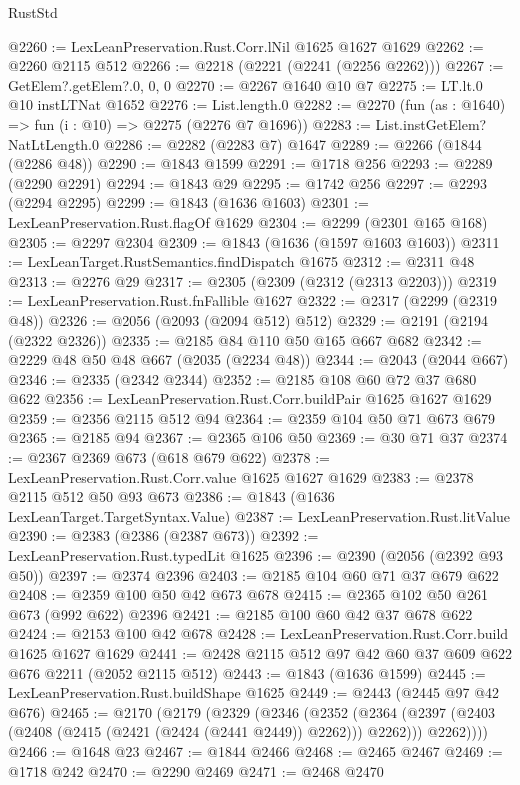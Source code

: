 \begin{lexlean}{RustStd}
\begin{coremodule}
@2260 := LexLeanPreservation.Rust.Corr.lNil @1625 @1627 @1629
@2262 := @2260 @2115 @512
@2266 := @2218 (@2221 (@2241 (@2256 @2262)))
@2267 := GetElem?.getElem?.{0, 0, 0}
@2270 := @2267 @1640 @10 @7
@2275 := LT.lt.{0} @10 instLTNat @1652
@2276 := List.length.{0}
@2282 := @2270 (fun (as : @1640) => fun (i : @10) => @2275 (@2276 @7 @1696))
@2283 := List.instGetElem?NatLtLength.{0}
@2286 := @2282 (@2283 @7) @1647
@2289 := @2266 (@1844 (@2286 @48))
@2290 := @1843 @1599
@2291 := @1718 @256
@2293 := @2289 (@2290 @2291)
@2294 := @1843 @29
@2295 := @1742 @256
@2297 := @2293 (@2294 @2295)
@2299 := @1843 (@1636 @1603)
@2301 := LexLeanPreservation.Rust.flagOf @1629
@2304 := @2299 (@2301 @165 @168)
@2305 := @2297 @2304
@2309 := @1843 (@1636 (@1597 @1603 @1603))
@2311 := LexLeanTarget.RustSemantics.findDispatch @1675
@2312 := @2311 @48
@2313 := @2276 @29
@2317 := @2305 (@2309 (@2312 (@2313 @2203)))
@2319 := LexLeanPreservation.Rust.fnFallible @1627
@2322 := @2317 (@2299 (@2319 @48))
@2326 := @2056 (@2093 (@2094 @512) @512)
@2329 := @2191 (@2194 (@2322 @2326))
@2335 := @2185 @84 @110 @50 @165 @667 @682
@2342 := @2229 @48 @50 @48 @667 (@2035 (@2234 @48))
@2344 := @2043 (@2044 @667)
@2346 := @2335 (@2342 @2344)
@2352 := @2185 @108 @60 @72 @37 @680 @622
@2356 := LexLeanPreservation.Rust.Corr.buildPair @1625 @1627 @1629
@2359 := @2356 @2115 @512 @94
@2364 := @2359 @104 @50 @71 @673 @679
@2365 := @2185 @94
@2367 := @2365 @106 @50
@2369 := @30 @71 @37
@2374 := @2367 @2369 @673 (@618 @679 @622)
@2378 := LexLeanPreservation.Rust.Corr.value @1625 @1627 @1629
@2383 := @2378 @2115 @512 @50 @93 @673
@2386 := @1843 (@1636 LexLeanTarget.TargetSyntax.Value)
@2387 := LexLeanPreservation.Rust.litValue
@2390 := @2383 (@2386 (@2387 @673))
@2392 := LexLeanPreservation.Rust.typedLit @1625
@2396 := @2390 (@2056 (@2392 @93 @50))
@2397 := @2374 @2396
@2403 := @2185 @104 @60 @71 @37 @679 @622
@2408 := @2359 @100 @50 @42 @673 @678
@2415 := @2365 @102 @50 @261 @673 (@992 @622) @2396
@2421 := @2185 @100 @60 @42 @37 @678 @622
@2424 := @2153 @100 @42 @678
@2428 := LexLeanPreservation.Rust.Corr.build @1625 @1627 @1629
@2441 := @2428 @2115 @512 @97 @42 @60 @37 @609 @622 @676 @2211 (@2052 @2115 @512)
@2443 := @1843 (@1636 @1599)
@2445 := LexLeanPreservation.Rust.buildShape @1625
@2449 := @2443 (@2445 @97 @42 @676)
@2465 := @2170
    (@2179
      (@2329
        (@2346
          (@2352
            (@2364 (@2397 (@2403 (@2408 (@2415 (@2421 (@2424 (@2441 @2449)) @2262))) @2262)))
            @2262))))
@2466 := @1648 @23
@2467 := @1844 @2466
@2468 := @2465 @2467
@2469 := @1718 @242
@2470 := @2290 @2469
@2471 := @2468 @2470

\end{coremodule}
\end{lexlean}
